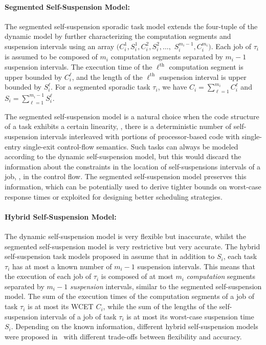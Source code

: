 \paragraph{Segmented Self-Suspension Model:} 

The {segmented} self-suspension sporadic task model extends the four-tuple of the dynamic model by further characterizing the computation segments and suspension 
intervals using an array $(C_{i}^1,S_{i}^1,C_{i}^2,S_{i}^2,\ldots, $ $S_{i}^{m_i-1},C_{i}^{m_i})$. Each job of $\tau_i$ is assumed to be composed of $m_i$ computation segments 
separated by $m_i-1$ suspension intervals. The execution time of the $\ell^{\text{th}}$ computation segment is upper bounded by  $C_{i}^{\ell}$, and the length of the $\ell^{\text{th}}$ suspension interval is upper bounded by $S_{i}^{\ell}$. For a segmented sporadic task $\tau_i$, we have 
$C_i = \sum_{\ell=1}^{m_i} C_i^\ell$ and $S_i=\sum_{\ell=1}^{m_i-1} S_i^\ell$.

The segmented self-suspension model is a natural choice when the code structure of a task exhibits a certain linearity,
\ie, there is a deterministic number of self-suspension intervals interleaved with portions of processor-based code with single-entry
single-exit control-flow semantics. Such tasks can always be modeled according to the dynamic self-suspension
model, but this would discard the information about the constraints in the location of self-suspensions intervals of a job, \ie, in the control flow. The segmented self-suspension model preserves this information, which can be potentially used
to derive tighter bounds on worst-case response times or exploited for designing better scheduling strategies.

\paragraph{Hybrid Self-Suspension Model:} 

The dynamic self-suspension model is very flexible but inaccurate, whilst the segmented self-suspension model is very restrictive but very accurate. The hybrid self-suspension task models proposed in \cite{DBLP:conf/rtcsa/BruggenHC17} assume that in addition to $S_i$, each task $\tau_i$ has at most a known number of $m_i-1$ suspension intervals.  This means that the execution of each job of $\tau_i$ is composed of at most $m_i$ \emph{computation} segments separated by $m_i-1$ \emph{suspension} intervals, similar to the segmented self-suspension model. The sum of the execution times of the computation segments of a job of task $\tau_i$ is at most its WCET $C_i$, while the sum of the lengths of the self-suspension intervals of a job of task $\tau_i$ is at most its worst-case suspension time $S_i$. Depending on the known information, different hybrid self-suspension models were proposed in~\cite{DBLP:conf/rtcsa/BruggenHC17} 
with different
trade-offs between flexibility and accuracy.

